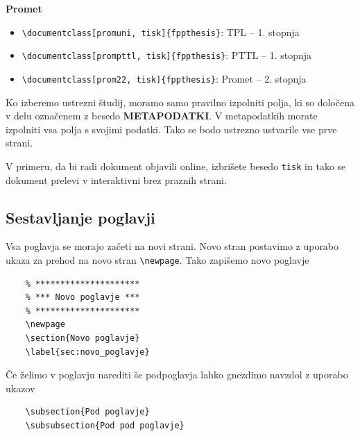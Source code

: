 \documentclass[12pt]{article}
\theoremstyle{definition}
\begin{document}
\textbf{Promet}
\begin{itemize}[nosep]
	\item \texttt{\textbackslash documentclass[promuni, tisk]\{fppthesis\}}: TPL -- 1. stopnja
	\item \texttt{\textbackslash documentclass[prompttl, tisk]\{fppthesis\}}: PTTL -- 1. stopnja
	\item \texttt{\textbackslash documentclass[prom22, tisk]\{fppthesis\}}: Promet -- 2. stopnja
\end{itemize}

Ko izberemo ustrezni študij, moramo samo pravilno izpolniti polja, ki so določena v delu označenem z besedo \textbf{METAPODATKI}. V metapodatkih morate izpolniti vsa polja s svojimi podatki. Tako se bodo ustrezno ustvarile vse prve strani.

V primeru, da bi radi dokument objavili online, izbrišete besedo \texttt{tisk} in tako se dokument prelevi v interaktivni brez praznih strani.

\subsection{Sestavljanje poglavji}

Vsa poglavja se morajo začeti na novi strani. Novo stran postavimo z uporabo ukaza za prehod na novo stran \texttt{\textbackslash newpage}. Tako zapišemo novo poglavje

\begin{verbatim}
	% *********************
	% *** Novo poglavje ***
	% *********************
	\newpage
	\section{Novo poglavje}
	\label{sec:novo_poglavje}	
\end{verbatim}

Če želimo v poglavju narediti še podpoglavja lahko gnezdimo navzdol z uporabo ukazov

\begin{verbatim}
	\subsection{Pod poglavje}
	\subsubsection{Pod pod poglavje}
\end{verbatim}
\end{document}
